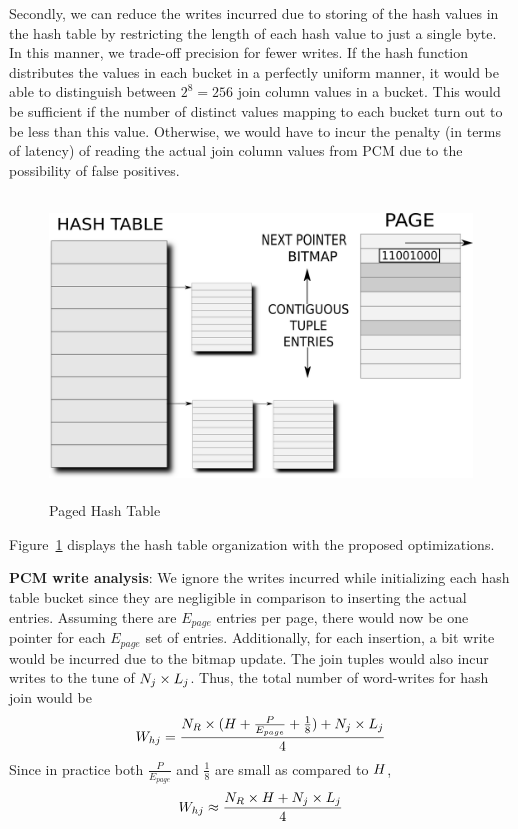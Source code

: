 Secondly, we can reduce the writes incurred due to storing of the hash values in
the hash table by restricting the length of each hash value to just a single byte. In this
manner, we trade-off precision for fewer writes. If the hash function
distributes the values in each bucket in a perfectly uniform manner, it
would be able to distinguish between $2^8 = 256$ join column values in a
bucket. This would be sufficient if the number of distinct values mapping
to each bucket turn out to be less than this value. Otherwise, we would
have to incur the penalty (in terms of latency) of reading the actual join
column values from PCM due to the possibility of false positives.

\begin{figure}[htpb]
	\includegraphics[height=80mm]{./fig/hash_table.png}\centering
	\caption{Paged Hash Table}
	\label{fig:hash_table}
\end{figure}

Figure~\ref{fig:hash_table} displays the hash table organization with the proposed optimizations.

\textbf{PCM write analysis}: We ignore the writes incurred while initializing each hash table bucket since they are negligible in comparison to inserting the actual entries. Assuming there are $E_{page}$ entries per page, there would now be one pointer for each $E_{page}$ set of entries. Additionally, for each insertion, a bit write would be incurred due to the bitmap update. The join tuples would also incur writes to the tune of $N_j \times L_j$. Thus, the total number of word-writes for hash join would be
$$W_{hj} = \frac{N_R \times (H +  \frac{P}{E_{page}} + \frac{1}{8} ) + N_j \times L_j }{4}$$
Since in practice both  $\frac{P}{E_{page}}$ and $\frac{1}{8}$ are small as compared to $H$, 
\vspace{-0.05in}
\begin{equation}\label{eq:hj}
 W_{hj} \approx \frac{ N_R \times H + N_j \times L_j}{4} 
\end{equation} 

